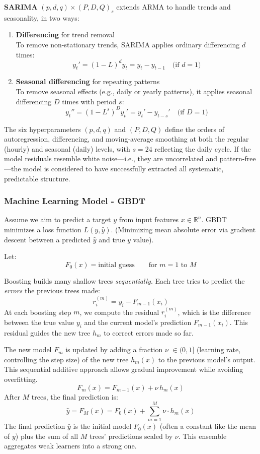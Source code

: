 \textbf{SARIMA} $(p,d,q)\times(P,D,Q)_s$ extends ARMA to handle trends and 
seasonality, in two ways: 
\begin{enumerate}
    \item \textbf{Differencing} for trend removal \\
        To remove non-stationary trends, SARIMA applies ordinary differencing $d$ times:
        \[
        y_t' = (1 - L)^d y_t = y_t - y_{t-1} \quad \text{(if } d = 1\text{)}
        \]
    \item \textbf{Seasonal differencing} for repeating patterns \\
        To remove seasonal effects (e.g., daily or yearly patterns), it applies 
        seasonal differencing $D$ times with period $s$:
        \[
        y_t'' = (1 - L^s)^D y_t' = y_t' - y_{t-s}' \quad \text{(if } D = 1\text{)}
        \]
\end{enumerate}

The six hyperparameters $(p,d,q)$ and $(P,D,Q)$ define the orders of autoregression, 
differencing, and moving-average smoothing at both the regular (hourly) and seasonal 
(daily) levels, with $s = 24$ reflecting the daily cycle. If the model residuals 
resemble white noise—i.e., they are uncorrelated and pattern-free—the model is 
considered to have successfully extracted all systematic, predictable structure.

\subsubsection*{Machine Learning Model - GBDT}
Assume we aim to predict a target $y$ from input features $x \in \mathbb{R}^n$. 
GBDT minimizes a loss function $L(y, \hat{y})$. (Minimizing mean absolute error via 
gradient descent between a predicted $\hat{y}$ and true $y$ value).

Let:
\[
F_0(x) = \text{initial guess} \quad\quad \text{for } m = 1 \text{ to } M
\]

Boosting builds many shallow trees \emph{sequentially}.  
Each tree tries to predict the \emph{errors} the previous trees made:
    \[
    r_i^{(m)} = y_i - F_{m-1}(x_i)
    \]
At each boosting step $m$, we compute the residual $r_i^{(m)}$, which is the difference 
between the true value $y_i$ and the current model’s prediction $F_{m-1}(x_i)$.
This residual guides the new tree $h_m$ to correct errors made so far.

The new model $F_m$ is updated by adding a fraction $\nu$ $\in (0, 1]$ (learning rate, 
controlling the step size) of the new tree $h_m(x)$ to the previous model’s output.
This sequential additive approach allows gradual improvement while avoiding overfitting.
    \[
    F_m(x) = F_{m-1}(x) + \nu\,h_m(x)
    \]
After $M$ trees, the final prediction is:
    \[
    \hat{y} = F_M(x) = F_0(x) + \sum_{m=1}^{M} \nu \cdot h_m(x)
    \] 
The final prediction $\hat{y}$ is the initial model $F_0(x)$ (often a constant 
like the mean of $y$) plus the sum of all $M$ trees' predictions scaled by $\nu$.
This ensemble aggregates weak learners into a strong one. 


